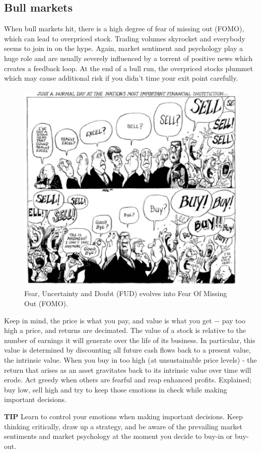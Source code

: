 \subsection{Bull markets}

When bull markets hit, there is a high degree of fear of missing out (FOMO), which can lead to overpriced stock. Trading volumes skyrocket and everybody seems to join in on the hype. Again, market sentiment and psychology play a huge role and are usually severely influenced by a torrent of positive news which creates a feedback loop. At the end of a bull run, the overpriced stocks plummet which may cause additional risk if you didn't time your exit point carefully.\medskip

\begin{figure}
    \centering
    \includegraphics[width=.6\textwidth]{img/ch-investing/FOMOFUD.png}
    \caption{Fear, Uncertainty and Doubt (FUD) evolves into Fear Of Missing Out (FOMO).}
    \label{fig:FOMOFUD}
\end{figure}

\medskip

Keep in mind, the price is what you pay, and value is what you get $-$ pay too high a price, and returns are decimated. The value of a stock is relative to the number of earnings it will generate over the life of its business. In particular, this value is determined by discounting all future cash flows back to a present value, the intrinsic value. When you buy in too high (at unsustainable price levels) - the return that arises as an asset gravitates back to its intrinsic value over time will erode. Act greedy when others are fearful and reap enhanced profits. Explained; buy low, sell high and try to keep those emotions in check while making important decisions.\medskip 

\begin{tipbox}{\textbf{TIP}}
    Learn to control your emotions when making important decisions. Keep thinking critically, draw up a strategy, and be aware of the prevailing market sentiments and market psychology at the moment you decide to buy-in or buy-out.
\end{tipbox}



